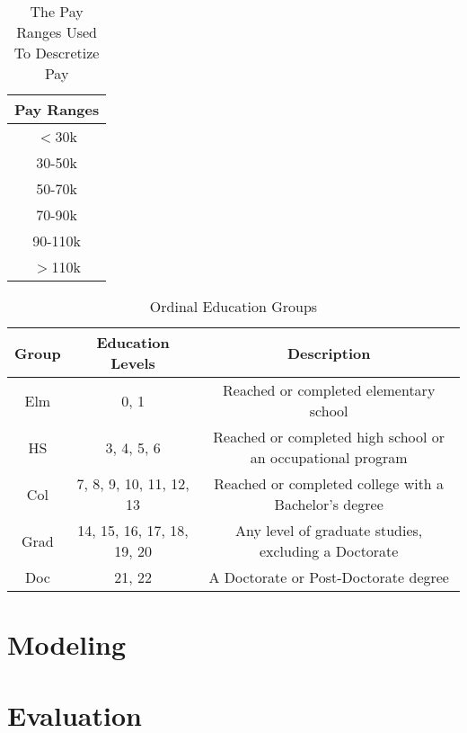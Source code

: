 \documentclass{article}
\begin{document}
    \begin{center}
        \begin{table}
            \centering
            \begin{tabular}{ |c| }
                \hline
                Pay Ranges \\
                \hline
                $<$30k \\
                30-50k \\
                50-70k \\
                70-90k \\
                90-110k \\
                $>$110k \\
                \hline
            \end{tabular}
            \caption{The Pay Ranges Used To Descretize Pay}
            \label{tab:1}
        \end{table}
    \end{center}

    \begin{center}
        \begin{table}
            \centering
            \begin{tabular}{ |c|c|c| }
                \hline
                Group & Education Levels & Description \\
                \hline
                Elm & 0, 1 & Reached or completed elementary school \\
                HS & 3, 4, 5, 6 & Reached or completed high school or an occupational program \\
                Col & 7, 8, 9, 10, 11, 12, 13 & Reached or completed college with a Bachelor's degree \\
                Grad & 14, 15, 16, 17, 18, 19, 20 & Any level of graduate studies, excluding a Doctorate \\
                Doc & 21, 22 & A Doctorate or Post-Doctorate degree \\
                \hline
            \end{tabular}
            \caption{Ordinal Education Groups}
            \label{tab:2}
        \end{table}
    \end{center}

\section{Modeling}

\section{Evaluation}
\end{document}
